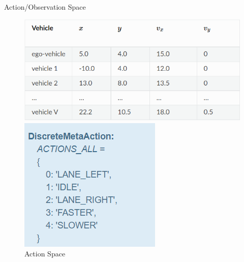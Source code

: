 \documentclass[final]{beamer}
\newlength{\onecolwid}
\begin{document}
\begin{frame}[t]
\begin{columns}[t]
\begin{column}{\onecolwid}
\begin{block}{Action/Observation Space}
\begin{figure}[!tbp]
    \vspace*{0.2cm}
    \centering
    \begin{minipage}[b]{0.55\textwidth}
      \includegraphics[width=\textwidth]{images/observation_space.png}
      \caption{Observation Space}
    \end{minipage}
    \hfill
    \begin{minipage}[b]{0.25\textwidth}
      \includegraphics[width=\textwidth]{images/action_space.png}
      \caption{Action Space}
    \end{minipage}
  \end{figure}

\end{block}

\end{column}


\end{columns}
\end{frame}
\end{document}
